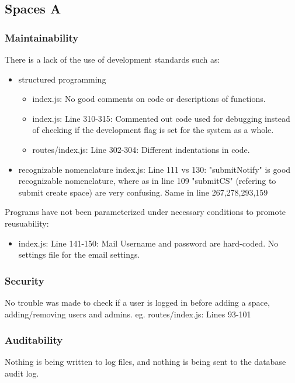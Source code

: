 
\subsection{Spaces A}

\subsubsection{Maintainability}
There is a lack of the use of development standards such as:
\begin{itemize}
	\item structured programming
		\begin{itemize}
			\item index.js: No good comments on code or descriptions of functions.
			\item index.js: Line 310-315: Commented out code used for debugging instead of checking if the development flag is set for the system as a whole.
			\item routes/index.js: Line 302-304: Different indentations in code.
		\end{itemize}
	\item recognizable nomenclature
index.js: Line 111 vs 130: "submitNotify" is good recognizable nomenclature, where as in line 109 "submitCS" (refering to submit create space) are very confusing. Same in line 267,278,293,159
\end{itemize}

Programs have not been parameterized under necessary conditions to promote reusuability:
\begin{itemize}
	\item index.js: Line 141-150: Mail Username and password are hard-coded. No settings file for the email settings.
	
\end{itemize}

\subsubsection{Security}

No trouble was made to check if a user is logged in before adding a space, adding/removing users and admins. eg. routes/index.js: Lines 93-101

\subsubsection{Auditability}

Nothing is being written to log files, and nothing is being sent to the database audit log.

